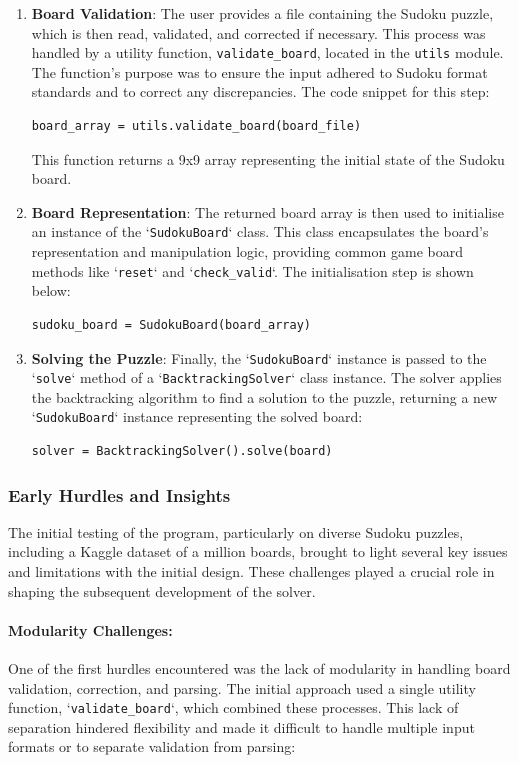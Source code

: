 \documentclass[11pt]{article}
\begin{document}
\begin{enumerate}
\item \textbf{Board Validation}: The user provides a file containing the Sudoku puzzle, which is then read, validated, and corrected if necessary. This process was handled by a utility function, \texttt{validate\_board}, located in the \texttt{utils} module. The function's purpose was to ensure the input adhered to Sudoku format standards and to correct any discrepancies. The code snippet for this step:
\begin{verbatim}
board_array = utils.validate_board(board_file)
\end{verbatim}
This function returns a 9x9 array representing the initial state of the Sudoku board.

\item \textbf{Board Representation}: The returned board array is then used to initialise an instance of the `\texttt{SudokuBoard}` class. This class encapsulates the board's representation and manipulation logic, providing common game board methods like `\texttt{reset}` and `\texttt{check\_valid}`. The initialisation step is shown below:
\begin{verbatim}
sudoku_board = SudokuBoard(board_array)
\end{verbatim}

\item \textbf{Solving the Puzzle}: Finally, the `\texttt{SudokuBoard}` instance is passed to the `\texttt{solve}` method of a `\texttt{BacktrackingSolver}` class instance. The solver applies the backtracking algorithm to find a solution to the puzzle, returning a new `\texttt{SudokuBoard}` instance representing the solved board:
\begin{verbatim}
solver = BacktrackingSolver().solve(board)
\end{verbatim}

\end{enumerate}

\subsubsection{Early Hurdles and Insights}
The initial testing of the program, particularly on diverse Sudoku puzzles, including a Kaggle dataset of a million boards, brought to light several key issues and limitations with the initial design. These challenges played a crucial role in shaping the subsequent development of the solver.

\paragraph{Modularity Challenges:}
One of the first hurdles encountered was the lack of modularity in handling board validation, correction, and parsing. The initial approach used a single utility function, `\texttt{validate\_board}`, which combined these processes. This lack of separation hindered flexibility and made it difficult to handle multiple input formats or to separate validation from parsing:
\end{document}
